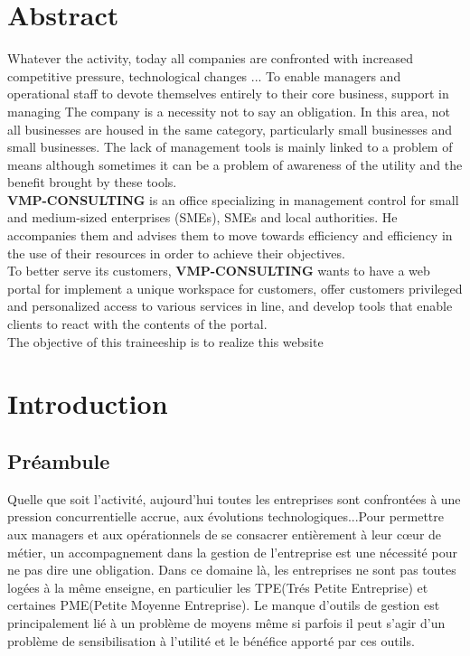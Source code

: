 \documentclass[12pt]{article}
\begin{document}
\section*{Abstract}
Whatever the activity, today all companies are confronted with increased competitive pressure, technological changes ... To enable managers and operational staff to devote themselves entirely to their core business, support in managing The company is a necessity not to say an obligation. In this area, not all businesses are housed in the same category, particularly small businesses and small businesses. The lack of management tools is mainly linked to a problem of means although sometimes it can be a problem of awareness of the utility and the benefit brought by these tools.\\
\textbf{VMP-CONSULTING}  is an office specializing in management control for small and medium-sized enterprises (SMEs), SMEs and local authorities. He accompanies them and advises them to move towards efficiency and efficiency in the use of their resources in order to achieve their objectives.\\
To better serve its customers, \textbf{VMP-CONSULTING}  wants to have a web portal for
implement a unique workspace for customers,
 offer customers privileged and personalized access to various services in
line, and
develop tools that enable clients to react with the contents of the
portal.\\
The objective of this traineeship is to realize this website

\newpage
\renewcommand{\contentsname}{Sommaire}
\tableofcontents
\newpage



\section{Introduction}

\subsection{Préambule}

Quelle que soit l’activité, aujourd’hui toutes les entreprises sont confrontées à une pression concurrentielle accrue, aux évolutions technologiques...Pour permettre aux managers et aux opérationnels de se consacrer entièrement à leur cœur de métier, un accompagnement dans la gestion de l'entreprise est une nécessité pour ne pas dire une obligation. Dans ce domaine là, les entreprises ne sont pas toutes logées à la même enseigne, en particulier les TPE(Trés Petite Entreprise) et certaines PME(Petite Moyenne Entreprise). Le manque d’outils de gestion est principalement lié à un problème de moyens même si parfois il peut s’agir d’un problème de sensibilisation à l’utilité et le bénéfice apporté par ces outils.\\ \\
\end{document}
